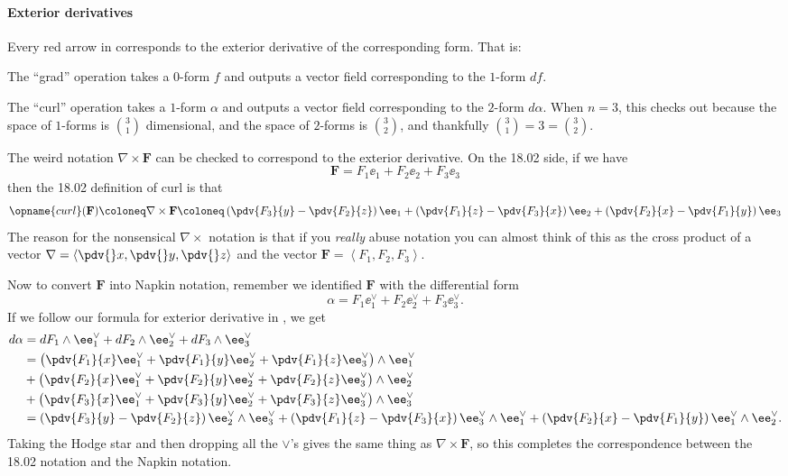 \paragraph{Exterior derivatives}
Every red arrow in  corresponds to the exterior derivative
of the corresponding form.
That is:
\begin{itemize}
	\ii The ``grad'' operation takes a $0$-form $f$ and outputs a vector field
	corresponding to the $1$-form $df$.

	\ii The ``curl'' operation takes a $1$-form $\alpha$ and outputs a vector field
	corresponding to the $2$-form $d\alpha$.
	When $n = 3$, this checks out because the space of $1$-forms is $\binom 31$ dimensional,
	and the space of $2$-forms is $\binom 32$, and thankfully $\binom 31 = 3 = \binom 32$.

	The weird notation $\nabla \times \mathbf{F}$
	can be checked to correspond to the exterior derivative.
	On the 18.02 side, if we have
	\[ \mathbf{F} = F_1 \ee_1 + F_2 \ee_2 + F_3 \ee_3 \]
	then the 18.02 definition of curl is that
	\[ \opname{curl}(\mathbf{F}) \coloneq \nabla \times \mathbf{F} \coloneq
		\left( \pdv{F_3}{y} - \pdv{F_2}{z} \right) \ee_1
		+ \left( \pdv{F_1}{z} - \pdv{F_3}{x} \right) \ee_2
		+ \left( \pdv{F_2}{x} - \pdv{F_1}{y} \right) \ee_3
	\]
	The reason for the nonsensical $\nabla \times$ notation
	is that if you \emph{really} abuse notation you can almost think of this as
	the cross product of a vector $\nabla = \left< \pdv{}x, \pdv{}y, \pdv{}z \right>$
	and the vector $\mathbf{F} = \left< F_1, F_2, F_3 \right>$.

	Now to convert $\mathbf{F}$ into Napkin notation,
	remember we identified $\mathbf{F}$ with the differential form
	\[ \alpha = F_1 \ee_1^\vee + F_2 \ee_2^\vee + F_3 \ee_3^\vee. \]
	If we follow our formula for exterior derivative in , we get
	\begin{align*}
		d\alpha &= dF_1 \wedge \ee_1^\vee + dF_2 \wedge \ee_2^\vee + dF_3 \wedge \ee_3^\vee \\
		&= \left( \pdv{F_1}{x} \ee_1^\vee + \pdv{F_1}{y} \ee_2^\vee + \pdv{F_1}{z} \ee_3^\vee \right) \wedge \ee_1^\vee \\
		&+ \left( \pdv{F_2}{x} \ee_1^\vee + \pdv{F_2}{y} \ee_2^\vee + \pdv{F_2}{z} \ee_3^\vee \right) \wedge \ee_2^\vee \\
		&+ \left( \pdv{F_3}{x} \ee_1^\vee + \pdv{F_3}{y} \ee_2^\vee + \pdv{F_3}{z} \ee_3^\vee \right) \wedge \ee_3^\vee \\
		&=
		\left( \pdv{F_3}{y} - \pdv{F_2}{z} \right) \ee_2^\vee \wedge \ee_3^\vee
		+ \left( \pdv{F_1}{z} - \pdv{F_3}{x} \right) \ee_3^\vee \wedge \ee_1^\vee
		+ \left( \pdv{F_2}{x} - \pdv{F_1}{y} \right) \ee_1^\vee \wedge \ee_2^\vee.
	\end{align*}
	Taking the Hodge star and then dropping all the $\vee$'s
	gives the same thing as $\nabla \times \mathbf{F}$,
	so this completes the correspondence between the 18.02 notation and the Napkin notation.


\end{itemize}
